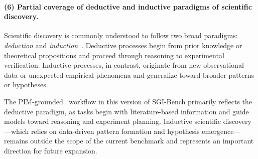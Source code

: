 \paragraph{(6) Partial coverage of deductive and inductive paradigms of scientific discovery.}
Scientific discovery is commonly understood to follow two broad paradigms: \textit{deduction} and \textit{induction}~\cite{bacon1878novum, popper2014conjectures}. Deductive processes begin from prior knowledge or theoretical propositions and proceed through reasoning to experimental verification. Inductive processes, in contrast, originate from new observational data or unexpected empirical phenomena and generalize toward broader patterns or hypotheses.  

The PIM-grounded~\cite{garrison1999critical, garrison2001critical} workflow in this version of SGI-Bench primarily reflects the deductive paradigm, as tasks begin with literature-based information and guide models toward reasoning and experiment planning. Inductive scientific discovery---which relies on data-driven pattern formation and hypothesis emergence---remains outside the scope of the current benchmark and represents an important direction for future expansion.